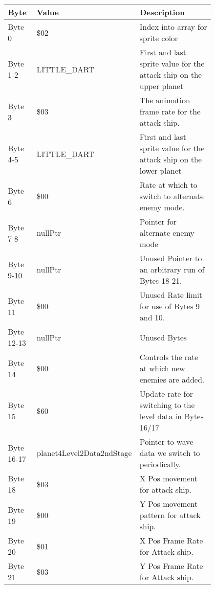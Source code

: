 \begin{figure}[H]
{\begin{adjustbox}{width=12cm}
\begin{tabular}{lll}
\toprule
 Byte       & Value                     & Description                                                         \\
\midrule
 Byte 0     & \$02                       & Index into array for sprite color                                   \\
 Byte 1-2   & LITTLE\_DART               & First and last sprite value for the attack ship on the upper planet \\
 Byte 3     & \$03                       & The animation frame rate for the attack ship.                       \\
 Byte 4-5   & LITTLE\_DART               & First and last sprite value for the attack ship on the lower planet \\
 Byte 6     & \$00                       & Rate at which to switch to alternate enemy mode.                    \\
 Byte 7-8   & nullPtr                   & Pointer for alternate enemy mode                                    \\
 Byte 9-10  & nullPtr                   & Unused Pointer to an arbitrary run of Bytes 18-21.                  \\
 Byte 11    & \$00                       & Unused Rate limit for use of Bytes 9 and 10.                        \\
 Byte 12-13 & nullPtr                   & Unused Bytes                                                        \\
 Byte 14    & \$00                       & Controls the rate at which new enemies are added.                   \\
 Byte 15    & \$60                       & Update rate for switching to the level data in Bytes 16/17          \\
 Byte 16-17 & planet4Level2Data2ndStage & Pointer to wave data we switch to periodically.                     \\
 Byte 18    & \$03                       & X Pos movement for attack ship.                                     \\
 Byte 19    & \$00                       & Y Pos movement pattern for attack ship.                             \\
 Byte 20    & \$01                       & X Pos Frame Rate for Attack ship.                                   \\
 Byte 21    & \$03                       & Y Pos Frame Rate for Attack ship.                                   \\

\end{tabular}
\end{adjustbox}}
\end{figure}
